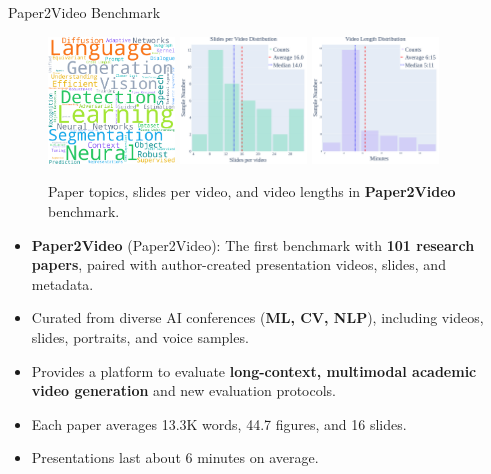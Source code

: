 \documentclass{beamer}
\newcommand{\alertterm}[1]{\alert{\textbf{#1}}}
\newcommand{\bench}{Paper2Video}
\begin{document}
\begin{frame}{Paper2Video Benchmark}
  \begin{figure}
    \centering
    \includegraphics[width=0.30\textwidth]{figure/paper_topics_wordcloud.pdf}
    \includegraphics[width=0.30\textwidth]{figure/slides_count_hist.pdf}
    \includegraphics[width=0.30\textwidth]{figure/video_length_hist.pdf}
    \caption{Paper topics, slides per video, and video lengths in \alertterm{Paper2Video} benchmark.}
    \label{fig:stat}
  \end{figure}
  \vspace{-1\baselineskip}
   \scriptsize
  \begin{itemize}
    \item \alertterm{Paper2Video} (\bench): The first benchmark with \alertterm{101 research papers}, paired with author-created presentation videos, slides, and metadata.
    \item Curated from diverse AI conferences (\alertterm{ML, CV, NLP}), including videos, slides, portraits, and voice samples.
    \item Provides a platform to evaluate \alertterm{long-context, multimodal academic video generation} and new evaluation protocols.
  \end{itemize}
  
  \begin{itemize}
    \item Each paper averages 13.3K words, 44.7 figures, and 16 slides.
    \item Presentations last about 6 minutes on average.
  \end{itemize}
\end{frame}
\end{document}
